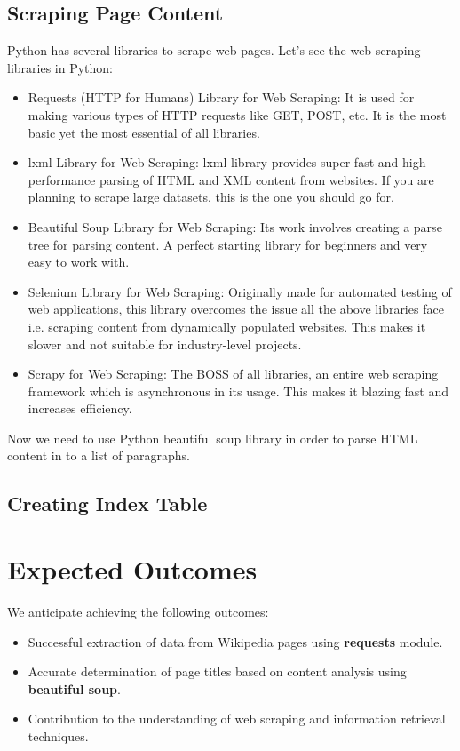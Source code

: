 \documentclass{article}
\begin{document}
\subsection{Scraping Page Content}
Python has several libraries to scrape web pages. Let's see the web scraping libraries in Python:

\begin{itemize}
    \item Requests (HTTP for Humans) Library for Web Scraping: It is used for making various types of HTTP requests like GET, POST, etc. It is the most basic yet the most essential of all libraries.
    \item lxml Library for Web Scraping: lxml library provides super-fast and high-performance parsing of HTML and XML content from websites. If you are planning to scrape large datasets, this is the one you should go for.
    \item Beautiful Soup Library for Web Scraping: Its work involves creating a parse tree for parsing content. A perfect starting library for beginners and very easy to work with.
    \item Selenium Library for Web Scraping: Originally made for automated testing of web applications, this library overcomes the issue all the above libraries face i.e. scraping content from dynamically populated websites. This makes it slower and not suitable for industry-level projects.
    \item Scrapy for Web Scraping: The BOSS of all libraries, an entire web scraping framework which is asynchronous in its usage. This makes it blazing fast and increases efficiency.
\end{itemize}

Now we need to use Python beautiful soup library in order to parse HTML content in to a list of paragraphs.

\subsection{Creating Index Table}

\section{Expected Outcomes}
We anticipate achieving the following outcomes:
\begin{itemize}
    \item Successful extraction of data from Wikipedia pages using \textbf{requests} module.
    \item Accurate determination of page titles based on content analysis using \textbf{beautiful soup}.
    \item Contribution to the understanding of web scraping and information retrieval techniques.
\end{itemize}
\end{document}
